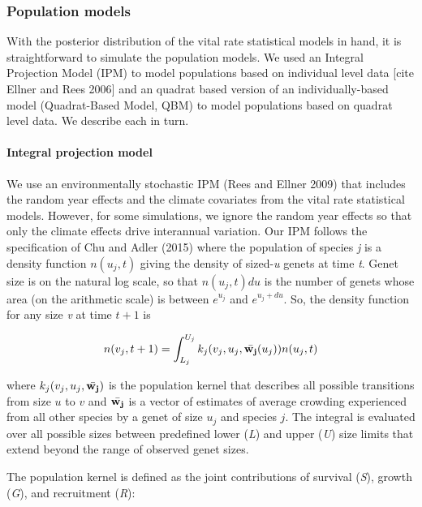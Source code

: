 \documentclass[12pt,]{article}
\begin{document}
\subsubsection{Population models}\label{population-models}

With the posterior distribution of the vital rate statistical models in
hand, it is straightforward to simulate the population models. We used
an Integral Projection Model (IPM) to model populations based on
individual level data {[}cite Ellner and Rees 2006{]} and an quadrat
based version of an individually-based model (Quadrat-Based Model, QBM)
to model populations based on quadrat level data. We describe each in
turn.

\paragraph{Integral projection model}\label{integral-projection-model}

We use an environmentally stochastic IPM (Rees and Ellner 2009) that
includes the random year effects and the climate covariates from the
vital rate statistical models. However, for some simulations, we ignore
the random year effects so that only the climate effects drive
interannual variation. Our IPM follows the specification of Chu and
Adler (2015) where the population of species \emph{j} is a density
function $n(u_{j},t)$ giving the density of sized-\emph{u} genets at
time \emph{t}. Genet size is on the natural log scale, so that
$n(u_{j},t)du$ is the number of genets whose area (on the arithmetic
scale) is between $e^{u_{j}}$ and $e^{u_{j}+du}$. So, the density
function for any size \emph{v} at time $t+1$ is

\begin{equation}
n(v_{j},t+1) = \int_{L_{j}}^{U_{j}} k_{j}(v_{j},u_{j},\bar{\bold{w_{j}}}(u_{j}))n(u_{j},t)
\end{equation}

where $k_{j}(v_{j},u_{j},\bar{\bold{w_{j}}})$ is the population kernel
that describes all possible transitions from size $u$ to $v$ and
$\bar{\bold{w_{j}}}$ is a vector of estimates of average crowding
experienced from all other species by a genet of size $u_j$ and species
$j$. The integral is evaluated over all possible sizes between
predefined lower (\emph{L}) and upper (\emph{U}) size limits that extend
beyond the range of observed genet sizes.

The population kernel is defined as the joint contributions of survival
(\emph{S}), growth (\emph{G}), and recruitment (\emph{R}):
\end{document}
